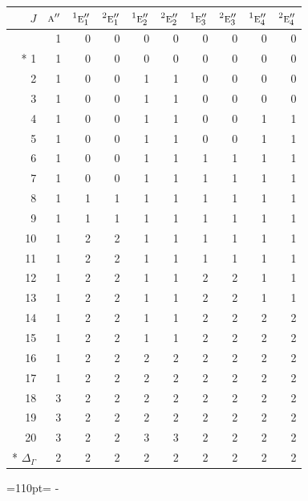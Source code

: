 \documentclass[10pt,a4paper]{article}
\makeatletter
\def\grouprule#1#2{\noalign{\marks\LTgroupmarks{\the\belowrulesep}\nobreak\vskip#1%
  \vskip\aboverulesep}\multispan\LT@cols\unskip{\leaders\hrule\@height#2\hfill\kern\z@}\cr
  \noalign{\penalty\LTrulebreak\vskip\belowrulesep\global\@lastruleclass\z@}}
\newcommand{\needspace}[1]{\par\penalty-100\begingroup\dimen0=#1\relax\dimen2=\pagegoal
  \advance\dimen2-\pagetotal\ifdim\dimen0>\dimen2\relax\ifdim\dimen2>0pt\vfil\break\fi\fi
  \endgroup}
\numberwithin{equation}{section}
\newcommand{\irr}[1]{\text{\normalfont\scshape #1}}
\newcommand{\conjpair}[1]{{}^{#1}}
\makeatother
\begin{document}
{\small\begin{longtable}{@{}rrrrrrrrrr@{}}\toprule
$J$ & $\irr{a}''$ & $\conjpair{1}\irr{e}_{1}''$ & $\conjpair{2}\irr{e}_{1}''$ & $\conjpair{1}\irr{e}_{2}''$ & $\conjpair{2}\irr{e}_{2}''$ & $\conjpair{1}\irr{e}_{3}''$ & $\conjpair{2}\irr{e}_{3}''$ & $\conjpair{1}\irr{e}_{4}''$ & $\conjpair{2}\irr{e}_{4}''$\\\midrule\endhead
\bottomrule\endfoot\endlastfoot
0 & 1 & 0 & 0 & 0 & 0 & 0 & 0 & 0 & 0\\*
1 & 1 & 0 & 0 & 0 & 0 & 0 & 0 & 0 & 0\\
2 & 1 & 0 & 0 & 1 & 1 & 0 & 0 & 0 & 0\\
3 & 1 & 0 & 0 & 1 & 1 & 0 & 0 & 0 & 0\\
4 & 1 & 0 & 0 & 1 & 1 & 0 & 0 & 1 & 1\\
5 & 1 & 0 & 0 & 1 & 1 & 0 & 0 & 1 & 1\\
6 & 1 & 0 & 0 & 1 & 1 & 1 & 1 & 1 & 1\\
7 & 1 & 0 & 0 & 1 & 1 & 1 & 1 & 1 & 1\\
8 & 1 & 1 & 1 & 1 & 1 & 1 & 1 & 1 & 1\\
9 & 1 & 1 & 1 & 1 & 1 & 1 & 1 & 1 & 1\\
10 & 1 & 2 & 2 & 1 & 1 & 1 & 1 & 1 & 1\\
11 & 1 & 2 & 2 & 1 & 1 & 1 & 1 & 1 & 1\\
12 & 1 & 2 & 2 & 1 & 1 & 2 & 2 & 1 & 1\\
13 & 1 & 2 & 2 & 1 & 1 & 2 & 2 & 1 & 1\\
14 & 1 & 2 & 2 & 1 & 1 & 2 & 2 & 2 & 2\\
15 & 1 & 2 & 2 & 1 & 1 & 2 & 2 & 2 & 2\\
16 & 1 & 2 & 2 & 2 & 2 & 2 & 2 & 2 & 2\\
17 & 1 & 2 & 2 & 2 & 2 & 2 & 2 & 2 & 2\\
18 & 3 & 2 & 2 & 2 & 2 & 2 & 2 & 2 & 2\\
19 & 3 & 2 & 2 & 2 & 2 & 2 & 2 & 2 & 2\\
20 & 3 & 2 & 2 & 3 & 3 & 2 & 2 & 2 & 2\\*
\grouprule{0pt}{\lightrulewidth} $\Delta_\Gamma$ & 2 & 2 & 2 & 2 & 2 & 2 & 2 & 2 & 2\\
\bottomrule\end{longtable}}
\needspace{110pt}
\end{document}
